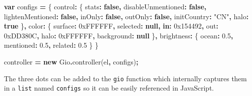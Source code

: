 \documentclass[
]{krantz}
\makeatletter
\newenvironment{Shaded}{\begin{snugshade}}{\end{snugshade}}
\newcommand{\BaseNTok}[1]{\textcolor[rgb]{0.06,0.06,0.06}{#1}}
\newcommand{\DataTypeTok}[1]{\textcolor[rgb]{0.27,0.27,0.27}{#1}}
\newcommand{\FloatTok}[1]{\textcolor[rgb]{0.06,0.06,0.06}{#1}}
\newcommand{\FunctionTok}[1]{\textcolor[rgb]{0,0,0}{#1}}
\newcommand{\KeywordTok}[1]{\textcolor[rgb]{0.27,0.27,0.27}{\textbf{#1}}}
\newcommand{\NormalTok}[1]{#1}
\newcommand{\OperatorTok}[1]{\textcolor[rgb]{0.43,0.43,0.43}{\textbf{#1}}}
\newcommand{\StringTok}[1]{\textcolor[rgb]{0.5,0.5,0.5}{#1}}
\newenvironment{kframe}{%
\medskip{}
\setlength{\fboxsep}{.8em}
 \def\at@end@of@kframe{}%
 \ifinner\ifhmode%
  \def\at@end@of@kframe{\end{minipage}}%
  \begin{minipage}{\columnwidth}%
 \fi\fi%
 \def\FrameCommand##1{\hskip\@totalleftmargin \hskip-\fboxsep
 \colorbox{shadecolor}{##1}\hskip-\fboxsep
     \hskip-\linewidth \hskip-\@totalleftmargin \hskip\columnwidth}%
 \MakeFramed {\advance\hsize-\width
   \@totalleftmargin\z@ \linewidth\hsize
   \@setminipage}}%
 {\par\unskip\endMakeFramed%
 \at@end@of@kframe}
\renewenvironment{Shaded}{\begin{kframe}}{\end{kframe}}
\makeatother
\begin{document}
\begin{Shaded}
\begin{Highlighting}[]
\KeywordTok{var}\NormalTok{ configs }\OperatorTok{=}\NormalTok{ \{}
  \DataTypeTok{control}\OperatorTok{:}\NormalTok{ \{}
    \DataTypeTok{stats}\OperatorTok{:} \KeywordTok{false}\OperatorTok{,}
    \DataTypeTok{disableUnmentioned}\OperatorTok{:} \KeywordTok{false}\OperatorTok{,}
    \DataTypeTok{lightenMentioned}\OperatorTok{:} \KeywordTok{false}\OperatorTok{,}
    \DataTypeTok{inOnly}\OperatorTok{:} \KeywordTok{false}\OperatorTok{,}
    \DataTypeTok{outOnly}\OperatorTok{:} \KeywordTok{false}\OperatorTok{,}
    \DataTypeTok{initCountry}\OperatorTok{:} \StringTok{"CN"}\OperatorTok{,}
    \DataTypeTok{halo}\OperatorTok{:} \KeywordTok{true}
\NormalTok{  \}}\OperatorTok{,}
  \DataTypeTok{color}\OperatorTok{:}\NormalTok{ \{}
    \DataTypeTok{surface}\OperatorTok{:} \BaseNTok{0xFFFFFF}\OperatorTok{,}
    \DataTypeTok{selected}\OperatorTok{:} \KeywordTok{null}\OperatorTok{,}
    \KeywordTok{in}\OperatorTok{:} \BaseNTok{0x154492}\OperatorTok{,}
    \DataTypeTok{out}\OperatorTok{:} \BaseNTok{0xDD380C}\OperatorTok{,}
    \DataTypeTok{halo}\OperatorTok{:} \BaseNTok{0xFFFFFF}\OperatorTok{,}
    \DataTypeTok{background}\OperatorTok{:} \KeywordTok{null}
\NormalTok{  \}}\OperatorTok{,}
  \DataTypeTok{brightness}\OperatorTok{:}\NormalTok{ \{}
    \DataTypeTok{ocean}\OperatorTok{:} \FloatTok{0.5}\OperatorTok{,}
    \DataTypeTok{mentioned}\OperatorTok{:} \FloatTok{0.5}\OperatorTok{,}
    \DataTypeTok{related}\OperatorTok{:} \FloatTok{0.5}
\NormalTok{  \}}
\NormalTok{\}}

\NormalTok{controller }\OperatorTok{=} \KeywordTok{new}\NormalTok{ Gio}\OperatorTok{.}\FunctionTok{controller}\NormalTok{(el}\OperatorTok{,}\NormalTok{ configs)}\OperatorTok{;}
\end{Highlighting}
\end{Shaded}

The three dots can be added to the \texttt{gio} function which internally captures them in a \texttt{list} named \texttt{configs} so it can be easily referenced in JavaScript.
\end{document}
